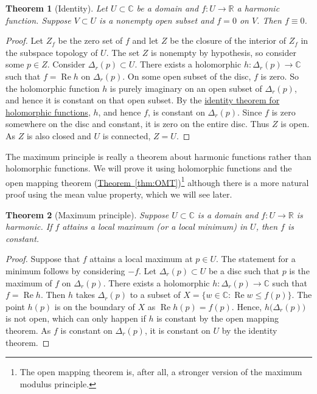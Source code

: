 \documentclass[12pt,openany]{book}
\renewcommand{\Re}{\operatorname{Re}}
\newcommand{\C}{{\mathbb{C}}}
\newcommand{\R}{{\mathbb{R}}}
\theoremstyle{plain}
\newtheorem{thm}{Theorem}[section]
\theoremstyle{remark}
\theoremstyle{definition}
\theoremstyle{exercise}
\theoremstyle{example}
\newcommand{\thmref}[1]{\hyperref[#1]{Theorem~\ref*{#1}}}
\begin{document}
\begin{thm}[Identity]
Let $U \subset \C$ be a domain and $f \colon U \to \R$ a harmonic function.
Suppose $V \subset U$ is a nonempty open subset and $f = 0$ on $V$.  Then $f
\equiv 0$.
\end{thm}

\begin{proof}
Let $Z_f$ be the zero set of $f$ and let $Z$ be the closure of the interior
of $Z_f$ in the subspace topology of $U$.
The set $Z$ is nonempty by hypothesis, so
consider some $p \in Z$.  Consider $\Delta_r(p) \subset U$.
There exists a holomorphic $h \colon \Delta_r(p) \to \C$
such that $f = \Re h$ on $\Delta_r(p)$.
On some open subset of the disc, $f$ is zero.
So the holomorphic function $h$ is purely imaginary on
an open subset of $\Delta_r(p)$, and hence it is constant on that open subset.
By the \hyperref[thm:identity]{identity theorem for holomorphic functions},
$h$, and hence $f$, is constant 
on $\Delta_r(p)$.
Since $f$ is zero somewhere on the
disc and constant, it is zero on the entire disc.
Thus $Z$ is open.
As $Z$ is also closed and $U$ is connected, $Z=U$.
\end{proof}

The maximum principle is really a theorem about harmonic functions rather
than holomorphic functions.  We will prove it using holomorphic functions
and the open mapping theorem (\thmref{thm:OMT})\footnote{%
The open mapping theorem is, after all,
a stronger version of the maximum modulus principle.}
although there is a more natural proof using the mean value property,
which we will see later.

\begin{thm}[Maximum principle]
%
Suppose $U \subset \C$ is a domain and $f \colon U \to \R$
is harmonic.  If $f$ attains a local maximum (or a local minimum) in $U$, then $f$ is constant.
\end{thm}

\begin{proof}
Suppose that $f$ attains a local maximum at $p \in U$.
The statement for a minimum follows by considering $-f$.
Let $\Delta_r(p) \subset U$
be a disc such that $p$ is the maximum of $f$ on $\Delta_r(p)$.
There exists a holomorphic $h \colon \Delta_r(p) \to \C$
such that $f = \Re h$.
Then $h$ takes
$\Delta_r(p)$ to a subset of $X = \bigl\{ w \in \C : \Re w \leq f(p) \bigr\}$.
The point $h(p)$ is on the boundary of $X$ as $\Re h(p)= f(p)$.  Hence,
$h\bigl(\Delta_r(p)\bigr)$ is not open, which can only happen if $h$ is
constant by the open mapping theorem.  As $f$ is constant on $\Delta_r(p)$, it is constant on $U$ by the
identity theorem.
\end{proof}
\end{document}
